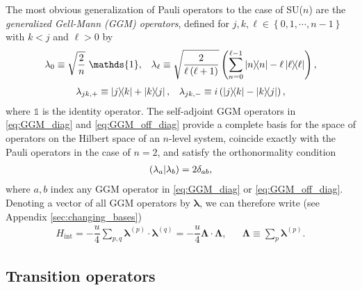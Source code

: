 \documentclass[nofootinbib,notitlepage,11pt]{revtex4-2}
\renewcommand{\t}{\text} %
\newcommand{\f}[2]{\dfrac{#1}{#2}} %
\newcommand{\p}[1]{\left(#1\right)} %
\renewcommand{\set}[1]{\left\{#1\right\}} %
\renewcommand{\v}{\bm} %
\renewcommand{\c}{\cdot} %
\newcommand{\1}{\mathds{1}}
\def\obk#1{\mathinner{({#1})}}
\begin{document}
The most obvious generalization of Pauli operators to the case of
SU($n$) are the {\it generalized Gell-Mann (GGM)
  operators}\cite{hioe1981level, bertlmann2008bloch}, defined for
$j,k,\ell\in\set{0,1,\cdots,n-1}$ with $k<j$ and $\ell>0$ by
\begin{align}
  \lambda_0 \equiv \sqrt{\f{2}{n}}~ \1,
  &&
  \lambda_\ell \equiv \sqrt{\f{2}{\ell\p{\ell+1}}}
  \p{\sum_{n=0}^{\ell-1}\op{n} - \ell \op{\ell}},
  \label{eq:GGM_diag}
\end{align}
\begin{align}
  \lambda_{jk,+} \equiv \op{j}{k} + \op{k}{j},
  &&
  \lambda_{jk,-} \equiv i\p{\op{j}{k} - \op{k}{j}},
  \label{eq:GGM_off_diag}
\end{align}
where $\1$ is the identity operator.  The self-adjoint GGM operators
in \eqref{eq:GGM_diag} and \eqref{eq:GGM_off_diag} provide a complete
basis for the space of operators on the Hilbert space of an $n$-level
system, coincide exactly with the Pauli operators in the case of
$n=2$, and satisfy the orthonormality condition
\begin{align}
  \obk{\lambda_a|\lambda_b} = 2\delta_{ab},
  \label{eq:GGM_inner}
\end{align}
where $a,b$ index any GGM operator in \eqref{eq:GGM_diag} or
\eqref{eq:GGM_off_diag}.  Denoting a vector of all GGM operators by
$\v\lambda$, we can therefore write (see Appendix
\ref{sec:changing_bases})
\begin{align}
  H_{\t{int}}
  = -\f{u}{4} \sum_{p,q} \v\lambda^{(p)} \c \v\lambda^{(q)}
  = -\f{u}{4} \v\Lambda \c \v\Lambda,
  &&
  \v\Lambda \equiv \sum_p \v\lambda^{(p)}.
  \label{eq:H_int_GGM}
\end{align}

\subsection{Transition operators}
\label{sec:trans_ops}
\end{document}

